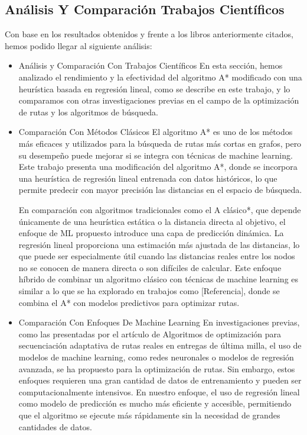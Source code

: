 \documentclass[conference]{IEEEtran}
\begin{document}
	\subsection{Análisis Y Comparación Trabajos Científicos}
	Con base en los resultados obtenidos y frente a los libros anteriormente citados, hemos podido llegar al siguiente análisis:
	\begin{itemize}
	\item Análisis y Comparación Con Trabajos Científicos
	En esta sección, hemos analizado el rendimiento y la efectividad del algoritmo A* modificado con una heurística basada en regresión lineal, como se describe en este trabajo, y lo comparamos con otras investigaciones previas en el campo de la optimización de rutas y los algoritmos de búsqueda.
	
	\item Comparación Con Métodos Clásicos
	El algoritmo A* es uno de los métodos más eficaces y utilizados para la búsqueda de rutas más cortas en grafos, pero su desempeño puede mejorar si se integra con técnicas de machine learning. Este trabajo presenta una modificación del algoritmo A*, donde se incorpora una heurística de regresión lineal entrenada con datos históricos, lo que permite predecir con mayor precisión las distancias en el espacio de búsqueda.

	En comparación con algoritmos tradicionales como el A clásico*, que depende únicamente de una heurística estática o la distancia directa al objetivo, el enfoque de ML propuesto introduce una capa de predicción dinámica. La regresión lineal proporciona una estimación más ajustada de las distancias, lo que puede ser especialmente útil cuando las distancias reales entre los nodos no se conocen de manera directa o son difíciles de calcular. Este enfoque híbrido de combinar un algoritmo clásico con técnicas de machine learning es similar a lo que se ha explorado en trabajos como [Referencia], donde se combina el A* con modelos predictivos para optimizar rutas.
	
	\item Comparación Con Enfoques De Machine Learning
	En investigaciones previas, como las presentadas por el artículo de Algoritmos de optimización para secuenciación adaptativa de rutas reales en entregas de última milla, el uso de modelos de machine learning, como redes neuronales o modelos de regresión avanzada, se ha propuesto para la optimización de rutas. Sin embargo, estos enfoques requieren una gran cantidad de datos de entrenamiento y pueden ser computacionalmente intensivos. En nuestro enfoque, el uso de regresión lineal como modelo de predicción es mucho más eficiente y accesible, permitiendo que el algoritmo se ejecute más rápidamente sin la necesidad de grandes cantidades de datos.


\end{itemize}
\end{document}
